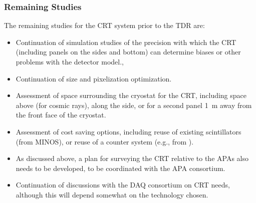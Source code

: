 

\subsubsection{Remaining Studies}

The remaining studies %
for the CRT system prior to the TDR are:
\begin{itemize}
\item Continuation of %
simulation studies of the precision with which %
the CRT (including panels on the sides and bottom) can determine biases or other problems with the detector model., 
\item Continuation of %
size and pixelization optimization. 
\item Assessment of %
space surrounding the cryostat for the CRT, including space above (for cosmic rays), along the side, or for a second panel \SI{1}{\m} away from the front face of the cryostat.
\item Assessment of cost saving options, including reuse of existing scintillators (from MINOS), or reuse of a counter system (e.g., from ).
\item As discussed above, a plan for surveying the CRT relative to the APAs
also needs to be developed, to be coordinated with the APA consortium. 
\item Continuation of discussions with the DAQ consortium on CRT needs, although this will depend somewhat on the technology chosen.
\end{itemize}
